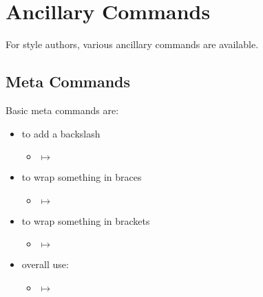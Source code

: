 

%

\section{Ancillary Commands}
\p For style authors, various ancillary commands are available.
\subsection{Meta Commands}
\p Basic meta commands are: 
\begin{itemize}
\item {} to add a backslash
\begin{itemize}
\item {} $\mapsto$ 
\end{itemize}
\item {} to wrap something in braces
\begin{itemize}
\item {} $\mapsto$ 
\end{itemize}
\item {} to wrap something in brackets
\begin{itemize}
\item {} $\mapsto$ 
\end{itemize}
\item overall use:
\begin{itemize}
\item {} $\mapsto$ 
\end{itemize}
\end{itemize}

\newcommand\smitem[1]{\begin{itemize}%
\item \cmd{#1}\braces{xyz} $\mapsto$ \csname #1\endcsname{xyz}%
\end{itemize}}



